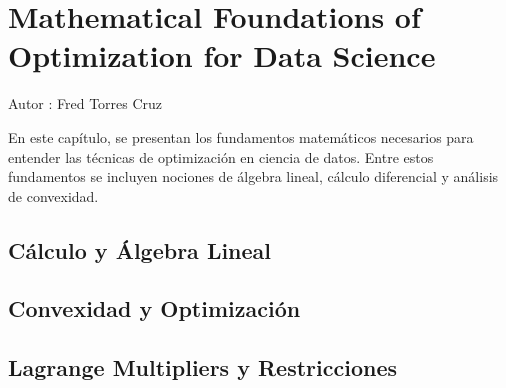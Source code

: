 \chapter{Mathematical Foundations of Optimization for Data Science}
Autor : \large{Fred Torres Cruz}
\label{chap:1}


\vspace{5em}
En este capítulo, se presentan los fundamentos matemáticos necesarios 
para entender las técnicas de optimización en ciencia de datos. 
Entre estos fundamentos se incluyen nociones de álgebra lineal, 
cálculo diferencial y análisis de convexidad.

\section{Cálculo y Álgebra Lineal}

\section{Convexidad y Optimización}

\section{Lagrange Multipliers y Restricciones}

